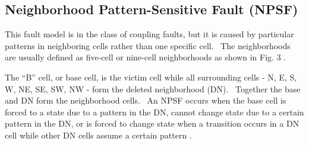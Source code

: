 \subsection{Neighborhood Pattern-Sensitive Fault (NPSF)}
This fault model is in the class of coupling faults, but it is caused by particular patterns in neighboring cells rather than one specific cell.  The neighborhoods are usually defined as five-cell or nine-cell neighborhoods as shown in Fig. 3 \cite{1047051}. 

The “B” cell, or base cell, is the victim cell while all surrounding cells - N, E, S, W, NE, SE, SW, NW - form the deleted neighborhood (DN).  Together the base and DN form the neighborhood cells.  An NPSF occurs when the base cell is forced to a state due to a pattern in the DN, cannot change state due to a certain pattern in the DN, or is forced to change state when a transition occurs in a DN cell while other DN cells assume a certain pattern \cite{1047051}.  

